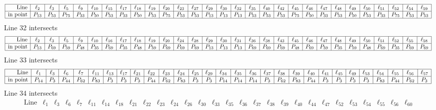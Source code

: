 \documentclass{article}
\begin{document}
{$$\begin{array}{|r*{28}{|c}|}
\hline
\mbox{Line}  & \ell_{2} & \ell_{3} & \ell_{5} & \ell_{9} & \ell_{10} & \ell_{15} & \ell_{17} & \ell_{18} & \ell_{19} & \ell_{20} & \ell_{23} & \ell_{27} & \ell_{29} & \ell_{30} & \ell_{32} & \ell_{35} & \ell_{40} & \ell_{42} & \ell_{45} & \ell_{46} & \ell_{47} & \ell_{48} & \ell_{49} & \ell_{50} & \ell_{51} & \ell_{52} & \ell_{54} & \ell_{59}\\
\hline
\mbox{in point}  & P_{13} & P_{53} & P_{75} & P_{33} & P_{50} & P_{53} & P_{33} & P_{50} & P_{53} & P_{75} & P_{53} & P_{53} & P_{13} & P_{13} & P_{13} & P_{53} & P_{53} & P_{53} & P_{75} & P_{50} & P_{33} & P_{53} & P_{50} & P_{53} & P_{33} & P_{75} & P_{53} & P_{53}\\
\hline
\end{array}
$$
Line 32 intersects 
$$
\begin{array}{|r*{28}{|c}|}
\hline
\mbox{Line}  & \ell_{2} & \ell_{3} & \ell_{5} & \ell_{9} & \ell_{10} & \ell_{16} & \ell_{17} & \ell_{18} & \ell_{19} & \ell_{20} & \ell_{24} & \ell_{28} & \ell_{29} & \ell_{30} & \ell_{31} & \ell_{36} & \ell_{38} & \ell_{43} & \ell_{45} & \ell_{46} & \ell_{47} & \ell_{48} & \ell_{49} & \ell_{50} & \ell_{51} & \ell_{52} & \ell_{55} & \ell_{58}\\
\hline
\mbox{in point}  & P_{13} & P_{69} & P_{59} & P_{48} & P_{35} & P_{69} & P_{35} & P_{48} & P_{59} & P_{69} & P_{69} & P_{69} & P_{13} & P_{13} & P_{13} & P_{69} & P_{69} & P_{69} & P_{48} & P_{69} & P_{59} & P_{35} & P_{59} & P_{48} & P_{69} & P_{35} & P_{69} & P_{69}\\
\hline
\end{array}
$$
Line 33 intersects 
$$
\begin{array}{|r*{28}{|c}|}
\hline
\mbox{Line}  & \ell_{1} & \ell_{3} & \ell_{6} & \ell_{7} & \ell_{11} & \ell_{13} & \ell_{17} & \ell_{21} & \ell_{22} & \ell_{23} & \ell_{24} & \ell_{25} & \ell_{29} & \ell_{34} & \ell_{35} & \ell_{36} & \ell_{37} & \ell_{38} & \ell_{39} & \ell_{40} & \ell_{41} & \ell_{45} & \ell_{49} & \ell_{53} & \ell_{54} & \ell_{55} & \ell_{56} & \ell_{57}\\
\hline
\mbox{in point}  & P_{14} & P_{3} & P_{44} & P_{62} & P_{83} & P_{3} & P_{3} & P_{3} & P_{44} & P_{62} & P_{83} & P_{3} & P_{3} & P_{14} & P_{14} & P_{14} & P_{3} & P_{62} & P_{83} & P_{44} & P_{3} & P_{3} & P_{3} & P_{3} & P_{83} & P_{44} & P_{62} & P_{3}\\
\hline
\end{array}
$$
Line 34 intersects 
$$
\begin{array}{|r*{28}{|c}|}
\hline
\mbox{Line}  & \ell_{1} & \ell_{3} & \ell_{6} & \ell_{7} & \ell_{11} & \ell_{14} & \ell_{18} & \ell_{21} & \ell_{22} & \ell_{23} & \ell_{24} & \ell_{26} & \ell_{30} & \ell_{33} & \ell_{35} & \ell_{36} & \ell_{37} & \ell_{38} & \ell_{39} & \ell_{40} & \ell_{44} & \ell_{47} & \ell_{52} & \ell_{53} & \ell_{54} & \ell_{55} & \ell_{56} & \ell_{60}\\

\end{array}$$}
\end{document}
